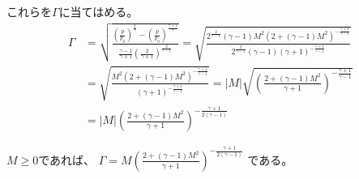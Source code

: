\documentclass[12pt,b5paper]{ltjsarticle}
\begin{document}
これらを$\Gamma$に当てはめる。
\begin{align}
 \Gamma
 &=
   \sqrt{
    \frac{
      \left(\frac{p}{p_{0}}\right)^{\frac{2}{\gamma}}
      -\left(\frac{p}{p_{0}}\right)^{\frac{\gamma+1}{\gamma}}
      }{
        \frac{\gamma-1}{\gamma+1}\left(\frac{2}{\gamma+1}\right)^{\frac{2}{\gamma-1}}
      }
  }
=\sqrt{\frac{
 2^{\frac{2}{\gamma-1}}
  (\gamma-1)M^{2}\left(2+(\gamma-1)M^{2} \right)^{-\frac{\gamma+1}{\gamma-1}}
 }{
  2^{\frac{2}{\gamma-1}}(\gamma-1)(\gamma+1)^{-\frac{\gamma+1}{\gamma-1}}
 }}\\
 &=
 \sqrt{\frac{
   M^{2}\left(2+(\gamma-1)M^{2} \right)^{-\frac{\gamma+1}{\gamma-1}}
 }{
  (\gamma+1)^{-\frac{\gamma+1}{\gamma-1}}
 }}
 =
 \lvert M \rvert
 \sqrt{\left(\frac{
   2+(\gamma-1)M^{2} }{ \gamma+1 }\right)^{-\frac{\gamma+1}{\gamma-1}}} \\
 &=
  \lvert M \rvert
 \left(\frac{2+(\gamma-1)M^{2} }{ \gamma+1 }\right)^{-\frac{\gamma+1}{2(\gamma-1)}}
\end{align}

$M \geq 0$であれば、
$\Gamma = M \left(\frac{2+(\gamma-1)M^{2} }{ \gamma+1 }\right)^{-\frac{\gamma+1}{2(\gamma-1)}}$
である。
\end{document}
